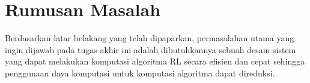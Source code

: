 \section{Rumusan Masalah}

Berdasarkan latar belakang yang telah dipaparkan, permasalahan utama yang ingin dijawab pada tugas akhir ini adalah dibutuhkannya sebuah desain sistem yang dapat melakukan komputasi algoritma RL secara efisien dan cepat sehingga penggunaan daya komputasi untuk komputasi algoritma dapat direduksi.
